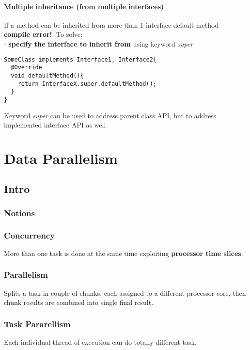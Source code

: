\documentclass{report}
\begin{document}
\subsubsection{Multiple inheritance (from multiple interfaces)}
If a method can be inherited from more than 1 interface default method - \textbf{compile error!}. To solve:\\
- \textbf{specify the interface to inherit from} using keyword \textit{super}:
\begin{verbatim}
SomeClass implements Interface1, Interface2{
  @Override
  void defaultMethod(){
    return InterfaceX.super.defaultMethod();
  }
}
\end{verbatim}

Keyword \textit{super} can be used to address parent class API, but to address implemented interface API as well

\chapter{Data Parallelism}
\section{Intro}
\subsection{Notions}
\subsection*{Concurrency}
More than one task is done at the same time exploiting \textbf{processor time slices}.

\subsection*{Parallelism}
Splits a task in couple of chunks, each assigned to a different processor core, then chunk results are combined into single final result.

\subsection*{Task Pararellism}
Each individual thread of execution can do totally different task.
\end{document}
